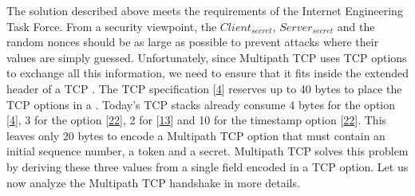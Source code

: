 \documentclass[letterpaper,10pt,english]{sphinxmanual}
\begin{document}
\sphinxAtStartPar
The solution described above meets the requirements of the Internet Engineering Task Force. From a security viewpoint, the \(Client_{secret}\), \(Server_{secret}\) and the random nonces should be as large as possible to prevent attacks where their values are simply guessed. Unfortunately, since Multipath TCP uses TCP options to exchange all this information, we need to ensure that it fits inside the extended header of a TCP . The TCP specification {[}\hyperlink{cite.biblio:id729}{4}{]} reserves up to 40 bytes to place the TCP options in a . Today’s TCP stacks already consume 4 bytes for the  option {[}\hyperlink{cite.biblio:id729}{4}{]}, 3 for the  option {[}\hyperlink{cite.biblio:id1255}{22}{]}, 2 for  {[}\hyperlink{cite.biblio:id1948}{13}{]} and 10 for the timestamp option {[}\hyperlink{cite.biblio:id1255}{22}{]}. This leaves only 20 bytes to encode a Multipath TCP option that must contain an initial sequence number, a token and a secret. Multipath TCP solves this problem by deriving these three values from a single field encoded in a TCP option. Let us now analyze the Multipath TCP handshake in more details.
\end{document}
